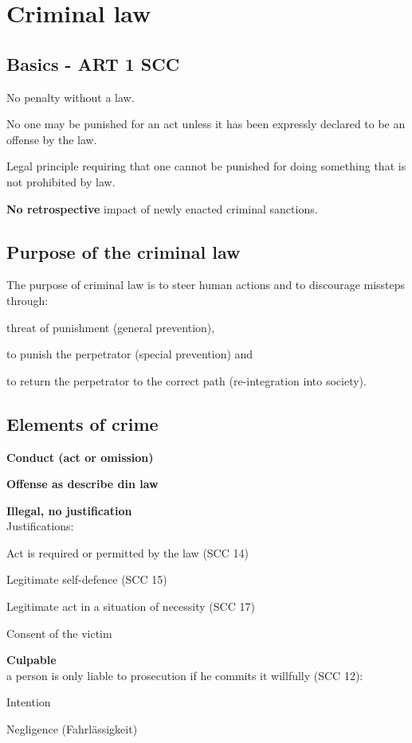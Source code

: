 \section{Criminal law}
\subsection{Basics - ART 1 SCC}
\begin{compactitem}
	\item No penalty without a law.
	\item No one may be punished for an act unless it has been expressly declared to be an offense by the law.
	\item Legal principle requiring that one cannot be punished for doing something	that is not prohibited by law.
	\item \textbf{No retrospective} impact of newly enacted criminal sanctions.
\end{compactitem}

\subsection{Purpose of the criminal law}
The purpose of criminal law is to steer human actions and to discourage missteps through:
\begin{compactitem}
	\item threat of punishment (general prevention),
	\item to punish the perpetrator (special prevention) and
	\item to return the perpetrator to the correct path (re-integration into society).
\end{compactitem}

\subsection{Elements of crime}
\begin{compactenum}
	\item \textbf{Conduct (act or omission)}
	\item \textbf{Offense as describe din law}
	\item \textbf{Illegal, no justification} \\
		Justifications:
		\begin{compactitem}
			\item Act is required or permitted by the law (SCC 14)
			\item Legitimate self-defence (SCC 15)
			\item Legitimate act in a situation of necessity (SCC 17)
			\item Consent of the victim
		\end{compactitem}
	\item \textbf{Culpable}\\
		a person is only liable to prosecution if he commits it willfully (SCC 12):
		\begin{compactitem}
			\item Intention
			\item Negligence (Fahrlässigkeit)
		\end{compactitem}
\end{compactenum}

